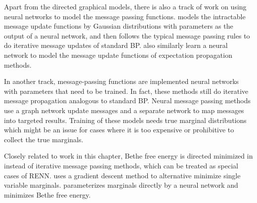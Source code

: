 Apart from the directed graphical models, there is also a track of work on using neural networks to model the message passing functions. \cite{akbayrak2019reparameterization} models the intractable message update functions by Gaussian distributions with parameters as the output of a neural network, and then follows the typical message passing rules to do iterative message updates of standard BP. \cite{jitkrittum2015kernel, heess2013learning} also similarly learn a neural network to model the message update functions of expectation propagation methods.


In another track, message-passing functions are implemented neural networks with parameters that need to be trained. In fact, these methods still do iterative message propagation analogous to standard BP.
Neural message passing methods \cite{yoon2019inferenceGraph, pmlr-v70-gilmer17a} use a  graph network update messages and a separate network to map messages into targeted results. Training of these models needs true marginal distributions which might be an issue for cases where it is too expensive or prohibitive to collect the true marginals.

Closely related to work in this chapter, Bethe free energy is directed minimized in \cite{welling2001belief,xionggyr19one-shot,NIPS2019_9687} instead of iterative message passing methods, which can be treated as special cases of RENN. \cite{welling2001belief} uses a gradient descent method to alternative minimize single variable marginals. \cite{NIPS2019_9687} parameterizes marginals directly by a neural network and minimizes Bethe free energy.


